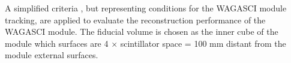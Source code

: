 A simplified criteria , but representing conditions for the WAGASCI module tracking, are applied to evaluate the reconstruction performance of the WAGASCI module. 
The fiducial volume is chosen as the inner cube of the module which surfaces are  4 × scintillator space = 100 mm distant from the module external surfaces.
%
%
